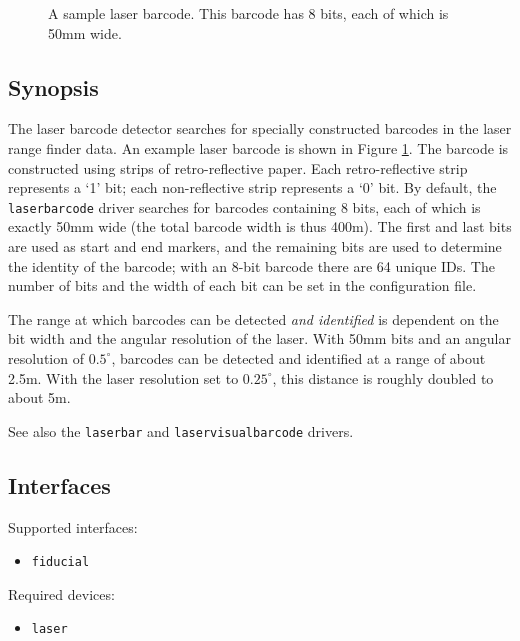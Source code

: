 
\begin{figure}[ht]
\begin{center}
\caption{A sample laser barcode.  This barcode has 8 bits, each of which 
is 50mm wide.}
\label{fig:laserbarcode}
\end{center}
\end{figure}

\subsection*{Synopsis}

The laser barcode detector searches for specially constructed barcodes
in the laser range finder data.  An example laser barcode is shown in
Figure \ref{fig:laserbarcode}.  The barcode is constructed using
strips of retro-reflective paper.  Each retro-reflective strip
represents a `1' bit; each non-reflective strip represents a `0' bit.
By default, the {\tt laserbarcode} driver searches for barcodes
containing 8 bits, each of which is exactly 50mm wide (the total
barcode width is thus 400m).  The first and last bits are used as
start and end markers, and the remaining bits are used to determine
the identity of the barcode; with an 8-bit barcode there are 64 unique
IDs.  The number of bits and the width of each bit can be set in the
configuration file.

The range at which barcodes can be detected {\em and identified} is dependent
on the bit width and the angular resolution of the laser.  With 50mm bits and
an angular resolution of $0.5^\circ$, barcodes can be detected and identified
at a range of about 2.5m.  With the laser resolution set to  $0.25^\circ$,
this distance is roughly doubled to about 5m.

See also the {\tt laserbar} and {\tt laservisualbarcode} drivers.


\subsection*{Interfaces}

\noindent Supported interfaces:
\begin{itemize}
\item {\tt fiducial}
\end{itemize}

\noindent Required devices:
\begin{itemize}
\item {\tt laser}
\end{itemize}

